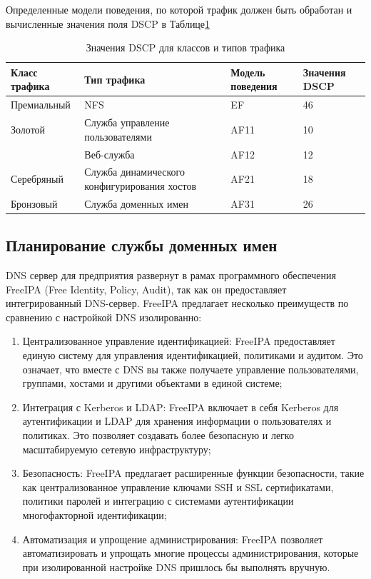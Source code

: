 Определенные модели поведения, по которой трафик должен быть обработан и вычисленные значения поля DSCP в Таблице\;\ref{table:some_shit_1}

\begin{table}[H]
\centering
{}
\caption{Значения DSCP для классов и типов трафика\;\label{table:some_shit_1}}
\small
\begin{tabularx}{\textwidth}{|X|X|X|X|}
	\hline
	Класс трафика & Тип трафика & Модель поведения & Значения DSCP \\
	\hline
	Премиальный 	   & NFS		& EF				& 46 \\
	\hline
	Золотой				& Служба управление пользователями & AF11 & 10 \\
	\cline{2-4}
						& Веб-служба						& AF12 & 12 \\
	\hline
	Серебряный 			& Служба динамического конфигурирования хостов & AF21 & 18 \\
	\hline
	Бронзовый 			& Служба доменных имен							& AF31 & 26 \\
	\hline
\end{tabularx}
\end{table}


\subsection{Планирование службы доменных имен}

DNS сервер для предприятия развернут в рамах программного обеспечения FreeIPA (Free Identity, Policy, Audit), так как он предоставляет интегрированный DNS-сервер. FreeIPA предлагает несколько преимуществ по сравнению с настройкой DNS изолированно:

\begin{enumerate}
	\item Централизованное управление идентификацией: FreeIPA предоставляет единую систему для управления идентификацией, политиками и аудитом. Это означает, что вместе с DNS вы также получаете управление пользователями, группами, хостами и другими объектами в единой системе;
	\item Интеграция с Kerberos и LDAP: FreeIPA включает в себя Kerberos для аутентификации и LDAP для хранения информации о пользователях и политиках. Это позволяет создавать более безопасную и легко масштабируемую сетевую инфраструктуру;
	\item Безопасность: FreeIPA предлагает расширенные функции безопасности, такие как централизованное управление ключами SSH и SSL сертификатами, политики паролей и интеграцию с системами аутентификации многофакторной идентификации;
	\item Автоматизация и упрощение администрирования: FreeIPA позволяет автоматизировать и упрощать многие процессы администрирования, которые при изолированной настройке DNS пришлось бы выполнять вручную.
\end{enumerate}

